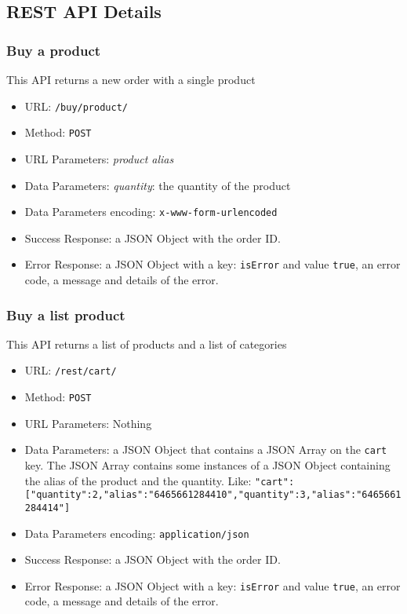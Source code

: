\subsection{REST API Details}


\subsubsection*{Buy a product}

This API returns a new order with a single product

\begin{itemize}
    \item URL: \texttt{/buy/product/}
    \item Method: \texttt{POST}
    \item URL Parameters: \textit{product alias}
    \item Data Parameters: \textit{quantity}: the quantity of the product
    \item Data Parameters encoding: \texttt{x-www-form-urlencoded}
    \item Success Response: a JSON Object with the order ID.
    \item Error Response: a JSON Object with a key: \texttt{isError}  and value \texttt{true}, an error code, a message and details of the error.

\end{itemize}

\subsubsection*{Buy a list product}

This API returns a list of products and a list of categories

\begin{itemize}
    \item URL: \texttt{/rest/cart/}
    \item Method: \texttt{POST}
    \item URL Parameters: Nothing
    \item Data Parameters: a JSON Object that contains a JSON Array on the \texttt{cart} key. The JSON Array contains some instances of a JSON Object  containing the alias of the product and the quantity. Like:
    \texttt{{"cart":[{"quantity":2,"alias":"6465661284410"},{"quantity":3,"alias":"6465661284414"}]}}
    \item Data Parameters encoding: \texttt{application/json}
    \item Success Response:  a JSON Object with the order ID.
    \item Error Response: a JSON Object with a key: \texttt{isError}  and value \texttt{true}, an error code, a message and details of the error.

\end{itemize}

